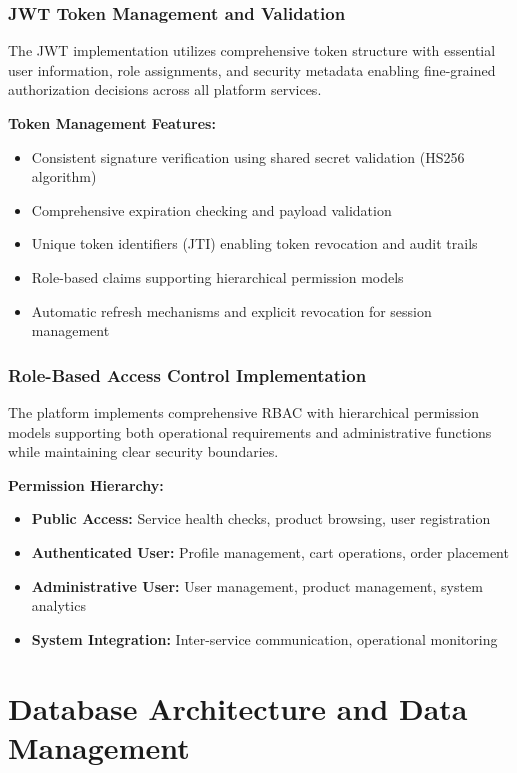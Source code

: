 \subsubsection{JWT Token Management and Validation}

The JWT implementation utilizes comprehensive token structure with essential user information, role assignments, and security metadata enabling fine-grained authorization decisions across all platform services.

\textbf{Token Management Features:}
\begin{itemize}
\item Consistent signature verification using shared secret validation (HS256 algorithm)
\item Comprehensive expiration checking and payload validation
\item Unique token identifiers (JTI) enabling token revocation and audit trails
\item Role-based claims supporting hierarchical permission models
\item Automatic refresh mechanisms and explicit revocation for session management
\end{itemize}

\subsubsection{Role-Based Access Control Implementation}

The platform implements comprehensive RBAC with hierarchical permission models supporting both operational requirements and administrative functions while maintaining clear security boundaries.

\textbf{Permission Hierarchy:}
\begin{itemize}
\item \textbf{Public Access:} Service health checks, product browsing, user registration
\item \textbf{Authenticated User:} Profile management, cart operations, order placement
\item \textbf{Administrative User:} User management, product management, system analytics
\item \textbf{System Integration:} Inter-service communication, operational monitoring
\end{itemize}

\section{Database Architecture and Data Management}

